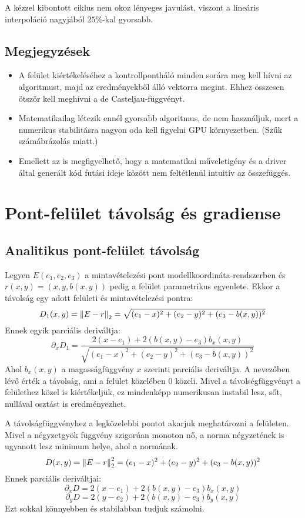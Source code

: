 A kézzel kibontott ciklus nem okoz lényeges javulást, viszont a lineáris interpoláció nagyjából $25\%$-kal gyorsabb. 


\subsection{Megjegyzések}
\begin{itemize}
	\item A felület kiértékeléséhez a kontrollpontháló minden sorára meg kell hívni az algoritmust, majd az eredményekből álló vektorra megint. Ehhez összesen ötször kell meghívni a de Casteljau-függvényt.
	\item Matematikailag létezik ennél gyorsabb algoritmus, de nem használjuk, mert a numerikus stabilitásra nagyon oda kell figyelni GPU környezetben. (Szűk számábrázolás miatt.)
	\item Emellett az is megfigyelhető, hogy a matematikai műveletigény és a driver által generált kód futási ideje között nem feltétlenül intuitív az összefüggés.
\end{itemize}


\section{Pont-felület távolság és gradiense}

\subsection{Analitikus pont-felület távolság}
Legyen $E(e_1,e_2,e_3)$ a mintavételezési pont modellkoordináta-rendszerben és $r(x,y) = (x,y,b(x,y))$ pedig a felület parametrikus egyenlete. Ekkor a távolság egy adott felületi és mintavételezési pontra:
$$ D_1(x,y) = \norm{E-r}_2 = \sqrt{(e_1-x)^2 + (e_2-y)^2 + (e_3-b(x,y))^2} $$
Ennek egyik parciális deriváltja: 
$$ \partial_xD_1 = \frac{2(x-e_1) + 2(b(x,y)-e_3)b_x(x,y)}{\sqrt{(e_1-x)^2 + (e_2-y)^2 + (e_3-b(x,y))^2}} $$
Ahol $b_x(x,y)$ a magasságfüggvény $x$ szerinti parciális deriváltja. A nevezőben lévő érték a távolság, ami a felület közelében $0$ közeli. Mivel a távolségfüggvényt a felülethez közel is kiértékeljük, ez mindenképp numerikusan instabil lesz, sőt, nullával osztást is eredményezhet. 

A távolságfüggvényhez a legközelebbi pontot akarjuk meghatározni a felületen. Mivel a négyzetgyök függvény szigorúan monoton nő, a norma négyzetének is ugyanott lesz minimum helye, ahol a normának.
$$ D(x,y) = \norm{E-r}_2^2 = (e_1-x)^2 + (e_2-y)^2 + (e_3-b(x,y))^2 $$
Ennek parciális deriváltjai: 
$$ \partial_xD = 2(x-e_1) + 2(b(x,y)-e_3)b_x(x,y) $$
$$ \partial_yD = 2(y-e_2) + 2(b(x,y)-e_3)b_y(x,y) $$
Ezt sokkal könnyebben és stabilabban tudjuk számolni.

